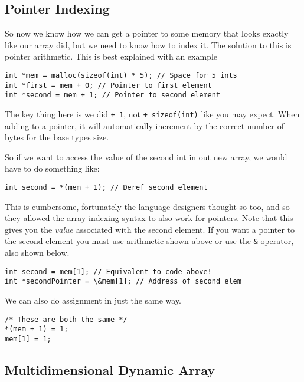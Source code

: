 \subsection{Pointer Indexing}

So now we know how we can get a pointer to some memory that looks exactly like our array did, but we need to know how to index it.
The solution to this is pointer arithmetic.
This is best explained with an example

\begin{lstlisting}
int *mem = malloc(sizeof(int) * 5); // Space for 5 ints
int *first = mem + 0; // Pointer to first element 
int *second = mem + 1; // Pointer to second element
\end{lstlisting}

The key thing here is we did \texttt{+ 1}, not \texttt{+ sizeof(int)} like you may expect.
When adding to a pointer, it will automatically increment by the correct number of bytes for the base types size.

So if we want to access the value of the second int in out new array, we would have to do something like:

\begin{lstlisting}[numbers=none,frame=none]
int second = *(mem + 1); // Deref second element
\end{lstlisting}

This is cumbersome, fortunately the language designers thought so too, and so they allowed the array indexing syntax to also work for pointers.
Note that this gives you the \emph{value} associated with the second element.
If you want a pointer to the second element you must use arithmetic shown above or use the \texttt{\&} operator, also shown below.

\begin{lstlisting}[numbers=none,frame=none]
int second = mem[1]; // Equivalent to code above!
int *secondPointer = \&mem[1]; // Address of second elem
\end{lstlisting}

We can also do assignment in just the same way.

\begin{lstlisting}
/* These are both the same */
*(mem + 1) = 1;
mem[1] = 1; 
\end{lstlisting}

\subsection{Multidimensional Dynamic Array}

